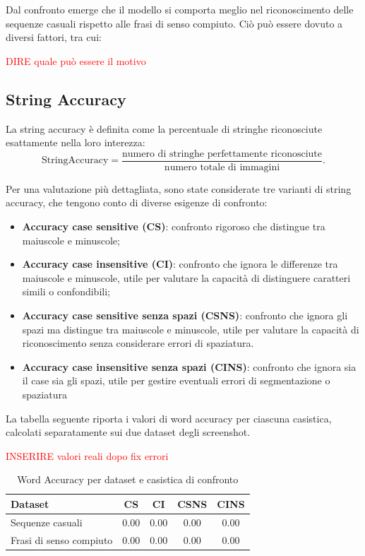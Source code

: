 Dal confronto emerge che il modello si comporta meglio nel riconoscimento delle sequenze casuali rispetto alle frasi di senso compiuto. Ciò può essere dovuto a diversi fattori, tra cui:

\textcolor{red}{DIRE quale può essere il motivo}

\subsection{String Accuracy}
La string accuracy è definita come la percentuale di stringhe riconosciute esattamente nella loro interezza:
\[
    \mathrm{StringAccuracy} = \frac{\text{numero di stringhe perfettamente riconosciute}}{\text{numero totale di immagini}}.
\]

Per una valutazione più dettagliata, sono state considerate tre varianti di string accuracy, che tengono conto di diverse esigenze di confronto:

\begin{itemize}
    \item \textbf{Accuracy case sensitive (CS)}: confronto rigoroso che distingue tra maiuscole e minuscole;
    \item \textbf{Accuracy case insensitive (CI)}: confronto che ignora le differenze tra maiuscole e minuscole, utile per valutare la capacità di distinguere caratteri simili o confondibili;
    \item \textbf{Accuracy case sensitive senza spazi (CSNS)}: confronto che ignora gli spazi ma distingue tra maiuscole e minuscole, utile per valutare la capacità di riconoscimento senza considerare errori di spaziatura.
    \item \textbf{Accuracy case insensitive senza spazi (CINS)}: confronto che ignora sia il case sia gli spazi, utile per gestire eventuali errori di segmentazione o spaziatura

\end{itemize}

La tabella seguente riporta i valori di word accuracy per ciascuna casistica, calcolati separatamente sui due dataset degli screenshot.

\textcolor{red}{INSERIRE valori reali dopo fix errori}

\begin{table}[htbp]
    \centering
    \begin{tabular}{lcccc}
        \toprule
        Dataset                 & CS & CI & CSNS & CINS \\
        \midrule
        Sequenze casuali        & 0.00 & 0.00 & 0.00 & 0.00 \\
        Frasi di senso compiuto & 0.00 & 0.00 & 0.00 & 0.00 \\
        \bottomrule
    \end{tabular}
    \caption{Word Accuracy per dataset e casistica di confronto}
    \label{tab:word_accuracy_stats}
\end{table}
